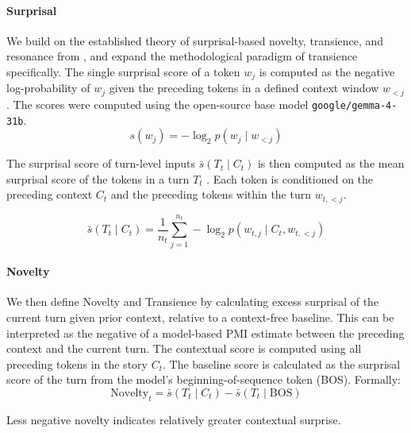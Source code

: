 \documentclass[11pt]{article}
\begin{document}
\paragraph{Surprisal}
We build on the established theory of surprisal-based novelty, transience, and resonance from \citet{fundal2026directionalalignmentnarrativeagency}, and expand the methodological paradigm of transience specifically. The single surprisal score of a token $w_j$ is computed as the negative log-probability of $w_j$ given the preceding tokens in a defined context window $w_{<j}$. The scores were computed using the open-source base model \texttt{google/gemma-4-31b}.
 \begin{equation}
s(w_j) = -\log_2 p(w_j \mid w_{<j})
\end{equation}

The surprisal score of turn-level inputs $\bar{s}(T_t \mid C_t)$ is then computed as the mean surprisal score of the tokens in a turn $T_t$ . Each token is conditioned on the preceding context $C_t$ and the preceding tokens within the turn $w_{t,<j}$.

\begin{equation}
\bar{s}(T_t \mid C_t)
=
\frac{1}{n_t}
\sum_{j=1}^{n_t}
-\log_2 p(w_{t,j} \mid C_t, w_{t,<j})
\end{equation}
\paragraph{Novelty}
We then define Novelty and Transience by calculating excess surprisal of the current turn given prior context, relative to a context-free baseline.
This can be interpreted as the negative of a model-based PMI estimate between the preceding context and the current turn. The contextual score is computed using all preceding tokens in the story $C_t$. The baseline score is calculated as the surprisal score of the turn from the model's beginning-of-sequence token (BOS). Formally: 
\begin{equation}
\mathrm{Novelty}_t = \bar{s}(T_t \mid C_t) - \bar{s}(T_t \mid \mathrm{BOS})
\end{equation}

Less negative novelty indicates relatively greater contextual surprise. 
\end{document}
